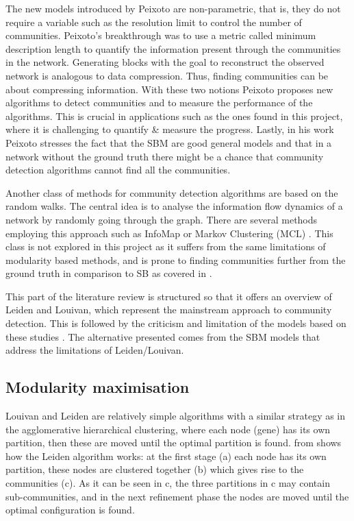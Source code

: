 The new models introduced by Peixoto are non-parametric, that is, they do not require a variable such as the resolution limit to control the number of communities. Peixoto's breakthrough was to use a metric called minimum description length to quantify the information present through the communities in the network. Generating blocks with the goal to reconstruct the observed network is analogous to data compression. Thus, finding communities can be about compressing information. With these two notions Peixoto proposes new algorithms to detect communities and to measure the performance of the algorithms. This is crucial in applications such as the ones found in this project, where it is challenging to quantify \& measure the progress. Lastly, in his work Peixoto stresses the fact that the SBM are good general models and that in a network without the ground truth there might be a chance that community detection algorithms cannot find all the communities.

Another class of methods for community detection algorithms are based on the random walks. The central idea is to analyse the information flow dynamics of a network by randomly going through the graph. There are several methods employing this approach such as InfoMap  \citet{Rosvall2008-kw} or Markov Clustering (MCL) \citet{Van_Dongen2008-yj}. This class is not explored in this project as it suffers from the same limitations of modularity based methods, and is prone to finding communities further from the ground truth in comparison to SB as covered in \cite{Peixoto2021-jx}.

This part of the literature review is structured so that it offers an overview of Leiden and Louivan, which represent the mainstream approach to community detection. This is followed by the criticism and limitation of the models based on these studies \cite{Peixoto2021-jx, Peixoto2023-rt, Shemirani2023-ww}. The alternative presented comes from the SBM models that address the limitations of Leiden/Louivan.


\subsection{Modularity maximisation} \label{s:lit:mod_max}

Louivan \citet{Blondel2008-ik} and Leiden \citet{Traag2019-ne} are relatively simple algorithms with a similar strategy as in the agglomerative hierarchical clustering, where each node (gene) has its own partition, then these are moved until the optimal partition is found.  from \cite{Traag2019-ne} shows how the Leiden algorithm works: at the first stage (a) each node has its own partition, these nodes are clustered together (b) which gives rise to the communities (c). As it can be seen in c, the three partitions in c may contain sub-communities, and in the next refinement phase the nodes are moved until the optimal configuration is found.

